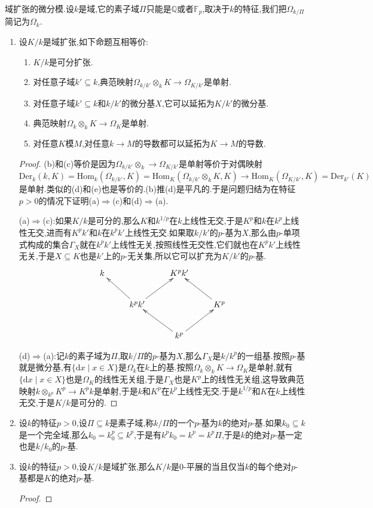 域扩张的微分模.设$k$是域,它的素子域$\Pi$只能是$\mathbb{Q}$或者$\mathbb{F}_p$,取决于$k$的特征,我们把$\Omega_{k/\Pi}$简记为$\Omega_k$.
\begin{enumerate}
	\item 设$K/k$是域扩张,如下命题互相等价:
	\begin{enumerate}
		\item $K/k$是可分扩张.
		\item 对任意子域$k'\subseteq k$,典范映射$\Omega_{k/k'}\otimes_kK\to\Omega_{K/k'}$是单射.
		\item 对任意子域$k'\subseteq k$和$k/k'$的微分基$X$,它可以延拓为$K/k'$的微分基.
		\item 典范映射$\Omega_k\otimes_kK\to\Omega_K$是单射.
		\item 对任意$K$模$M$,对任意$k\to M$的导数都可以延拓为$K\to M$的导数.
	\end{enumerate}
    \begin{proof}
    	
    	(b)和(c)等价是因为$\Omega_{k/k'}\otimes_k\to\Omega_{K/k'}$是单射等价于对偶映射$\mathrm{Der}_{k}(k,K)=\mathrm{Hom}_k(\Omega_{k/k'},K)=\mathrm{Hom}_K(\Omega_{k/k'}\otimes_kK,K)\to\mathrm{Hom}_K(\Omega_{K/k'},K)=\mathrm{Der}_{k'}(K)$是单射.类似的(d)和(e)也是等价的.(b)推(d)是平凡的.于是问题归结为在特征$p>0$的情况下证明(a)$\Rightarrow$(c)和(d)$\Rightarrow$(a).
    	
    	\qquad
    	
    	(a)$\Rightarrow$(c):如果$K/k$是可分的,那么$K$和$k^{1/p}$在$k$上线性无交,于是$K^p$和$k$在$k^p$上线性无交,进而有$K^pk'$和$k$在$k^pk'$上线性无交.如果取$k/k'$的$p$-基为$X$,那么由$p$-单项式构成的集合$\Gamma_X$就在$k^pk'$上线性无关,按照线性无交性,它们就也在$K^pk'$上线性无关,于是$X\subseteq K$也是$k'$上的$p$-无关集,所以它可以扩充为$K/k'$的$p$-基.
    	$$\xymatrix{k&&K^pk'&\\&k^pk'\ar[ul]\ar[ur]&&K^p\ar[ul]\\&&k^p\ar[ur]\ar[ul]&}$$
    	
    	(d)$\Rightarrow$(a):记$k$的素子域为$\Pi$,取$k/\Pi$的$p$-基为$X$,那么$\Gamma_X$是$k/k^p$的一组基.按照$p$-基就是微分基,有$\{\mathrm{d}x\mid x\in X\}$是$\Omega_k$在$k$上的基.按照$\Omega_k\otimes_kK\to\Omega_K$是单射,就有$\{\mathrm{d}x\mid x\in X\}$也是$\Omega_K$的线性无关组,于是$\Gamma_X$也是$K^p$上的线性无关组,这导致典范映射$k\otimes_{k^p}K^p\to K^pk$是单射,于是$k$和$K^p$在$k^p$上线性无交.于是$k^{1/p}$和$K$在$k$上线性无交,于是$K/k$是可分的.
    \end{proof}
    \item 设$k$的特征$p>0$,设$\Pi\subseteq k$是素子域,称$k/\Pi$的一个$p$-基为$k$的绝对$p$-基.如果$k_0\subseteq k$是一个完全域,那么$k_0=k_0^p\subseteq k^p$,于是有$k^pk_0=k^p=k^p\Pi$,于是$k$的绝对$p$-基一定也是$k/k_0$的$p$-基.
    \item 设$k$的特征$p>0$,设$K/k$是域扩张,那么$K/k$是0-平展的当且仅当$k$的每个绝对$p$-基都是$K$的绝对$p$-基.
    \begin{proof}
    	

\end{proof}
\end{enumerate}
